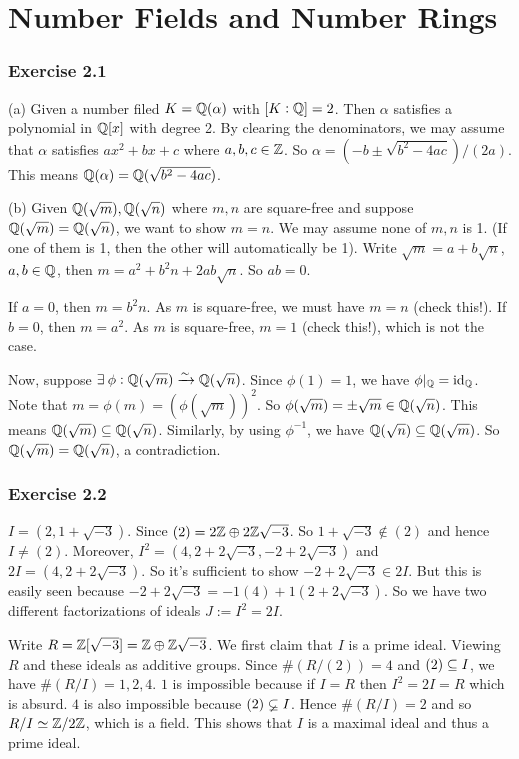 \documentclass[../Marcus.tex]{subfiles}
\begin{document}
	
\chapter{Number Fields and Number Rings}

\subsection*{Exercise 2.1}

(a) Given a number filed $K=\mathbb{Q}(\alpha)$ with $[K:\mathbb{Q}]=2$. Then $\alpha$ satisfies a polynomial in $\mathbb{Q}[x]$ with degree 2. By clearing the denominators, we may assume that $\alpha$ satisfies $ax^2+bx+c$ where $a,b,c\in \mathbb{Z}$. So $\alpha=(-b\pm \sqrt{b^2-4ac})/(2a)$. This means $\mathbb{Q}(\alpha)=\mathbb{Q}(\sqrt{b^2-4ac})$.

(b) Given $\mathbb{Q}(\sqrt{m}),\mathbb{Q}(\sqrt{n})$ where $m,n$ are square-free and suppose $\mathbb{Q}(\sqrt{m})=\mathbb{Q}(\sqrt{n})$, we want to show $m=n$. We may assume none of $m,n$ is 1. (If one of them is 1, then the other will automatically be 1). Write $\sqrt{m}=a+b\sqrt{n}$, $a,b\in\mathbb{Q}$, then $m=a^2+b^2n+2ab\sqrt{n}$. So $ab=0$.

If $a=0$, then $m=b^2n$. As $m$ is square-free, we must have $m=n$ (check this!). If $b=0$, then $m=a^2$. As $m$ is square-free, $m=1$ (check this!), which is not the case.

Now, suppose $\exists \phi:\QQ(\sqrt{m})\isoto\QQ(\sqrt{n})$. Since $\phi(1)=1$, we have $\phi |_{\mathbb{Q}}=\operatorname{id}_{\mathbb{Q}}$. Note that $m=\phi(m)=(\phi(\sqrt{m}))^2$. So $\phi(\sqrt{m})=\pm \sqrt{m}\in \mathbb{Q}(\sqrt{n})$. This means $\mathbb{Q}(\sqrt{m})\subseteq\mathbb{Q}(\sqrt{n})$. Similarly, by using $\phi^{-1}$, we have $\mathbb{Q}(\sqrt{n})\subseteq\mathbb{Q}(\sqrt{m})$. So $\mathbb{Q}(\sqrt{m})=\mathbb{Q}(\sqrt{n})$, a contradiction.

\subsection*{Exercise 2.2}

$I=(2,1+\sqrt{-3})$. Since $(2)=2\mathbb{Z}\oplus2\mathbb{Z}\sqrt{-3}$. So $1+\sqrt{-3}\notin(2)$ and hence $I\neq(2)$. Moreover, $I^2=(4,2+2\sqrt{-3},-2+2\sqrt{-3})$ and $2I=(4,2+2\sqrt{-3})$. So it's sufficient to show $-2+2\sqrt{-3}\in 2I$. But this is easily seen because $-2+2\sqrt{-3}=-1(4)+1(2+2\sqrt{-3})$. So we have two different factorizations of ideals $J:=I^2=2I$.

Write $R=\mathbb{Z}[\sqrt{-3}]=\mathbb{Z}\oplus\mathbb{Z}\sqrt{-3}$. We first claim that $I$ is a prime ideal. Viewing $R$ and these ideals as additive groups. Since $\#(R/(2))=4$ and $(2)\subseteq I$, we have $\#(R/I)=1,2,4$. $1$ is impossible because if $I=R$ then $I^2=2I=R$ which is absurd. $4$ is also impossible because $(2)\varsubsetneq I$. Hence $\#(R/I)=2$ and so $R/I\simeq \mathbb{Z}/2\mathbb{Z}$, which is a field. This shows that $I$ is a maximal ideal and thus a prime ideal.
\end{document}
